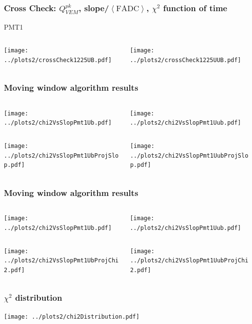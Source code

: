 \documentclass[aspectratio=169]{beamer}
\begin{document}
\begin{frame}
  \frametitle{Cross Check: $Q^{pk}_{VEM}$,
  slope/$\left<\mathrm{FADC}\right>$, $\chi^2$ function of time}
  PMT1
  \vspace{0.5cm}
  \begin{columns}
    \begin{column}{0.5\textwidth}
      \texttt{[image: ../plots2/crossCheck1225UB.pdf]}
    \end{column}
    \begin{column}{0.5\textwidth}
      \texttt{[image: ../plots2/crossCheck1225UUB.pdf]}
    \end{column}
  \end{columns}
\end{frame}

\begin{frame}
  \frametitle{Moving window algorithm results}
  \vspace{0.5cm}
  \begin{columns}
    \begin{column}{0.5\textwidth}
      \texttt{[image: ../plots2/chi2VsSlopPmt1Ub.pdf]}
    \end{column}
    \begin{column}{0.5\textwidth}
      \texttt{[image: ../plots2/chi2VsSlopPmt1Uub.pdf]}
    \end{column}
  \end{columns}
  \begin{columns}
    \begin{column}{0.5\textwidth}
      \texttt{[image: ../plots2/chi2VsSlopPmt1UbProjSlop.pdf]}
    \end{column}
    \begin{column}{0.5\textwidth}
      \texttt{[image: ../plots2/chi2VsSlopPmt1UubProjSlop.pdf]}
    \end{column}
  \end{columns}
\end{frame}

\begin{frame}
  \frametitle{Moving window algorithm results}
  \vspace{0.5cm}
  \begin{columns}
    \begin{column}{0.5\textwidth}
      \texttt{[image: ../plots2/chi2VsSlopPmt1Ub.pdf]}
    \end{column}
    \begin{column}{0.5\textwidth}
      \texttt{[image: ../plots2/chi2VsSlopPmt1Uub.pdf]}
    \end{column}
  \end{columns}
  \begin{columns}
    \begin{column}{0.5\textwidth}
      \texttt{[image: ../plots2/chi2VsSlopPmt1UbProjChi2.pdf]}
    \end{column}
    \begin{column}{0.5\textwidth}
      \texttt{[image: ../plots2/chi2VsSlopPmt1UubProjChi2.pdf]}
    \end{column}
  \end{columns}
\end{frame}


\begin{frame}
  \frametitle{$\chi^2$ distribution}
  \vspace{0.5cm}  
  \begin{center}
    \texttt{[image: ../plots2/chi2Distribution.pdf]}
  \end{center}
\end{frame}
\end{document}
